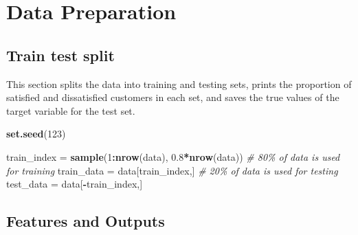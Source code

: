 \documentclass[
]{article}
\newenvironment{Shaded}{\begin{snugshade}}{\end{snugshade}}
\newcommand{\CommentTok}[1]{\textcolor[rgb]{0.56,0.35,0.01}{\textit{#1}}}
\newcommand{\DecValTok}[1]{\textcolor[rgb]{0.00,0.00,0.81}{#1}}
\newcommand{\FloatTok}[1]{\textcolor[rgb]{0.00,0.00,0.81}{#1}}
\newcommand{\FunctionTok}[1]{\textcolor[rgb]{0.13,0.29,0.53}{\textbf{#1}}}
\newcommand{\NormalTok}[1]{#1}
\newcommand{\OtherTok}[1]{\textcolor[rgb]{0.56,0.35,0.01}{#1}}
\newcommand{\SpecialCharTok}[1]{\textcolor[rgb]{0.81,0.36,0.00}{\textbf{#1}}}
\begin{document}
\hypertarget{data-preparation}{%
\section{Data Preparation}\label{data-preparation}}

\hypertarget{train-test-split}{%
\subsection{Train test split}\label{train-test-split}}

This section splits the data into training and testing sets, prints the
proportion of satisfied and dissatisfied customers in each set, and
saves the true values of the target variable for the test set.

\begin{Shaded}
\begin{Highlighting}[]
\FunctionTok{set.seed}\NormalTok{(}\DecValTok{123}\NormalTok{)}

\NormalTok{train\_index }\OtherTok{=} \FunctionTok{sample}\NormalTok{(}\DecValTok{1}\SpecialCharTok{:}\FunctionTok{nrow}\NormalTok{(data), }\FloatTok{0.8}\SpecialCharTok{*}\FunctionTok{nrow}\NormalTok{(data))}
\CommentTok{\# 80\% of data is used for training}
\NormalTok{train\_data }\OtherTok{=}\NormalTok{ data[train\_index,]}
\CommentTok{\# 20\% of data is used for testing}
\NormalTok{test\_data }\OtherTok{=}\NormalTok{ data[}\SpecialCharTok{{-}}\NormalTok{train\_index,]}
\end{Highlighting}
\end{Shaded}

\hypertarget{features-and-outputs}{%
\subsection{Features and Outputs}\label{features-and-outputs}}

\begin{Shaded}
\end{Shaded}
\end{document}
